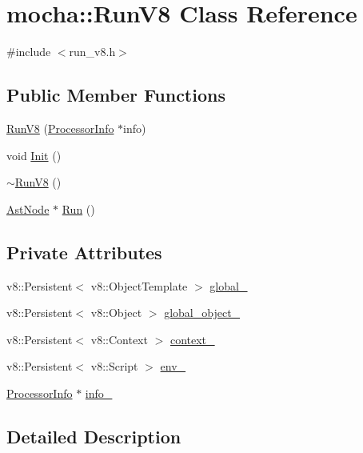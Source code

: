 \hypertarget{classmocha_1_1_run_v8}{
\section{mocha::RunV8 Class Reference}
\label{classmocha_1_1_run_v8}
}


{\ttfamily \#include $<$run\_\-v8.h$>$}

\subsection*{Public Member Functions}
\begin{DoxyCompactItemize}
\item 
\hyperlink{classmocha_1_1_run_v8_aea5ca1cfb71ae8b2cd82c836626d56c5}{RunV8} (\hyperlink{classmocha_1_1_processor_info}{ProcessorInfo} $\ast$info)
\item 
void \hyperlink{classmocha_1_1_run_v8_acb8de5bbcb26a05153585423ea100c70}{Init} ()
\item 
\hyperlink{classmocha_1_1_run_v8_ae155917a97d08ae6a36698ef2be7a247}{$\sim$RunV8} ()
\item 
\hyperlink{classmocha_1_1_ast_node}{AstNode} $\ast$ \hyperlink{classmocha_1_1_run_v8_a129ffe379eb9b197a567bce341401614}{Run} ()
\end{DoxyCompactItemize}
\subsection*{Private Attributes}
\begin{DoxyCompactItemize}
\item 
v8::Persistent$<$ v8::ObjectTemplate $>$ \hyperlink{classmocha_1_1_run_v8_aab781f007bc484a88f1230e74a58b4ed}{global\_\-}
\item 
v8::Persistent$<$ v8::Object $>$ \hyperlink{classmocha_1_1_run_v8_aa46a56cddee1d07bd60b3c3022f3071a}{global\_\-object\_\-}
\item 
v8::Persistent$<$ v8::Context $>$ \hyperlink{classmocha_1_1_run_v8_ab4f151c5bf59900c257e86db24d8b0b0}{context\_\-}
\item 
v8::Persistent$<$ v8::Script $>$ \hyperlink{classmocha_1_1_run_v8_a46c73214d895adf2d6953f3ba725d421}{env\_\-}
\item 
\hyperlink{classmocha_1_1_processor_info}{ProcessorInfo} $\ast$ \hyperlink{classmocha_1_1_run_v8_a39a819b8eacdb05dc0acd6b3e5f26153}{info\_\-}
\end{DoxyCompactItemize}


\subsection{Detailed Description}


